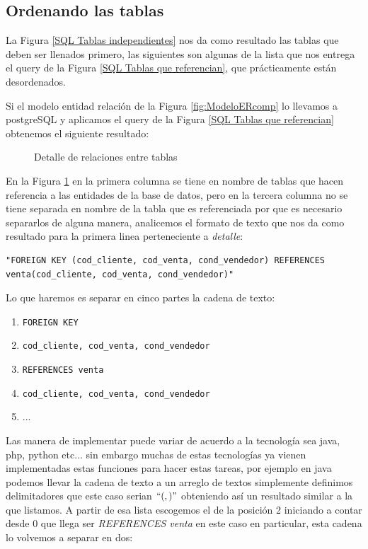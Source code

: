 \subsection{Ordenando las tablas}
La Figura \ref{SQL Tablas independientes} nos da  como resultado las tablas que deben ser llenados primero, las siguientes son algunas de la lista que nos entrega el query de la Figura \ref{SQL Tablas que referencian}, que pr\'acticamente est\'an desordenados.

Si el modelo entidad relaci\'on de la Figura \ref{fig:ModeloERcomp} lo llevamos a postgreSQL y aplicamos el query de la Figura \ref{SQL Tablas que referencian} obtenemos el siguiente resultado:\\
\begin{figure}[H]
\centering
{}
\caption{Detalle de relaciones entre tablas} \label{fig:referenciasModeloComp}
\end{figure}
En la Figura \ref{fig:referenciasModeloComp} en la primera columna se tiene en nombre de tablas que hacen referencia a las entidades de la base de datos, pero en la tercera columna no se tiene separada en nombre de la tabla que es referenciada por que es necesario separarlos de alguna manera, analicemos el formato de texto que nos da como resultado para la primera linea perteneciente a \textit{detalle}:
\lstset{language=sql,breaklines=true}
\begin{lstlisting}
"FOREIGN KEY (cod_cliente, cod_venta, cond_vendedor) REFERENCES venta(cod_cliente, cod_venta, cond_vendedor)"
\end{lstlisting}
Lo que haremos es separar en cinco partes la cadena de texto:
\begin{enumerate}
\item \texttt{FOREIGN KEY}
\item \texttt{cod\_cliente, cod\_venta, cond\_vendedor}
\item \texttt{REFERENCES venta}
\item \texttt{cod\_cliente, cod\_venta, cond\_vendedor}
\item ...
\end{enumerate}
Las manera de implementar puede variar de acuerdo a la tecnolog\'ia sea java, php, python etc... sin embargo muchas de estas tecnolog\'ias ya vienen implementadas estas funciones para hacer estas tareas, por ejemplo en java podemos llevar la cadena de texto a un arreglo de textos simplemente definimos delimitadores que este caso serian $`` (  ,  )  "$   obteniendo as\'i un resultado similar a la que listamos. A partir de esa lista escogemos el de la posici\'on 2 iniciando a contar desde 0 que llega ser \textit{REFERENCES venta} en este caso en particular, esta cadena lo volvemos a separar en dos:
